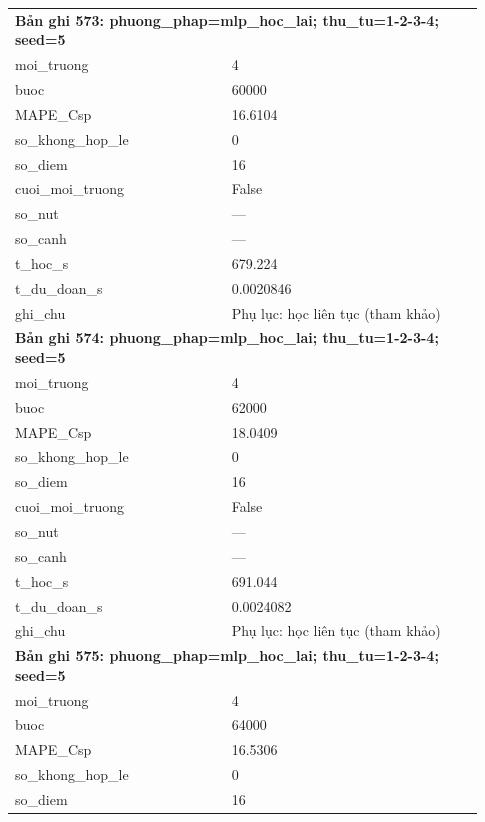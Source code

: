 \begin{longtable}{p{0.43\linewidth}p{0.50\linewidth}}
\midrule
\multicolumn{2}{p{0.95\linewidth}}{\textbf{Bản ghi 573: phuong\_phap=mlp\_hoc\_lai; thu\_tu=1-2-3-4; seed=5}} \\
moi\_\allowbreak truong & 4 \\
buoc & 60000 \\
MAPE\_\allowbreak Csp & 16.6104 \\
so\_\allowbreak khong\_\allowbreak hop\_\allowbreak le & 0 \\
so\_\allowbreak diem & 16 \\
cuoi\_\allowbreak moi\_\allowbreak truong & False \\
so\_\allowbreak nut & — \\
so\_\allowbreak canh & — \\
t\_\allowbreak hoc\_\allowbreak s & 679.224 \\
t\_\allowbreak du\_\allowbreak doan\_\allowbreak s & 0.0020846 \\
ghi\_\allowbreak chu & Phụ lục: học liên tục (tham khảo) \\
\midrule
\multicolumn{2}{p{0.95\linewidth}}{\textbf{Bản ghi 574: phuong\_phap=mlp\_hoc\_lai; thu\_tu=1-2-3-4; seed=5}} \\
moi\_\allowbreak truong & 4 \\
buoc & 62000 \\
MAPE\_\allowbreak Csp & 18.0409 \\
so\_\allowbreak khong\_\allowbreak hop\_\allowbreak le & 0 \\
so\_\allowbreak diem & 16 \\
cuoi\_\allowbreak moi\_\allowbreak truong & False \\
so\_\allowbreak nut & — \\
so\_\allowbreak canh & — \\
t\_\allowbreak hoc\_\allowbreak s & 691.044 \\
t\_\allowbreak du\_\allowbreak doan\_\allowbreak s & 0.0024082 \\
ghi\_\allowbreak chu & Phụ lục: học liên tục (tham khảo) \\
\midrule
\multicolumn{2}{p{0.95\linewidth}}{\textbf{Bản ghi 575: phuong\_phap=mlp\_hoc\_lai; thu\_tu=1-2-3-4; seed=5}} \\
moi\_\allowbreak truong & 4 \\
buoc & 64000 \\
MAPE\_\allowbreak Csp & 16.5306 \\
so\_\allowbreak khong\_\allowbreak hop\_\allowbreak le & 0 \\
so\_\allowbreak diem & 16 \\

\end{longtable}
